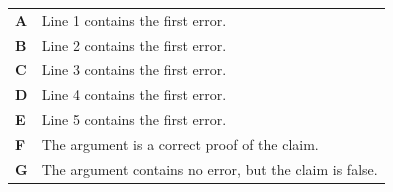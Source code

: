 \documentclass[11pt,a4paper]{article}
\begin{document}
\begin{enumerate}[label=\textbf{\arabic*.},leftmargin=*,itemsep=0pt,start=1]
\par\vspace*{12pt}
\begin{tabularx}{\linewidth}{@{}>{\bfseries}l Y@{}}
A &
Line 1 contains the first error.
\\[0.8em]
B &
Line 2 contains the first error.
\\[0.8em]
C &
Line 3 contains the first error.
\\[0.8em]
D &
Line 4 contains the first error.
\\[0.8em]
E &
Line 5 contains the first error.
\\[0.8em]
F &
The argument is a correct proof of the claim.
\\[0.8em]
G &
The argument contains no error, but the claim is false.
\\
\end{tabularx}
\end{enumerate}
\clearpage
\thispagestyle{djspaper}
\vspace*{8pt}
\end{document}
